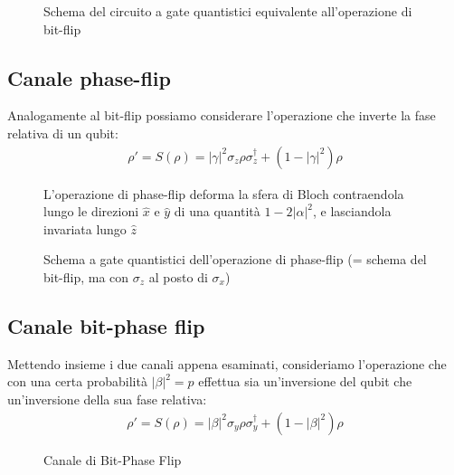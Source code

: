 \documentclass[../../InformazioneQuantistica.tex]{subfiles}
\begin{document}
\begin{figure}[H]
\centering

\caption{Schema del circuito a gate quantistici equivalente all'operazione di bit-flip\label{fig:bit-flip-gate}}
\end{figure}

\subsection{Canale phase-flip}
Analogamente al bit-flip possiamo considerare l'operazione che inverte la fase relativa di un qubit:
\begin{align*}
\rho' = S(\rho) = |\gamma|^2 \sigma_z \rho \sigma_z^\dag + (1-|\gamma|^2)\rho
\end{align*}

\begin{figure}[H]
\centering

\caption{L'operazione di phase-flip deforma la sfera di Bloch contraendola lungo le direzioni $\hat{x}$ e $\hat{y}$ di una quantità $1-2|\alpha|^2$, e lasciandola invariata lungo $\hat{z}$\label{fig:bit-phaseflip-geometrica}}
\end{figure}


\begin{figure}[H]
\centering

\caption{Schema a gate quantistici dell'operazione di phase-flip (= schema del bit-flip, ma con $\sigma_z$ al posto di $\sigma_x$)\label{fig:phase-flip}}
\end{figure}

\subsection{Canale bit-phase flip}
Mettendo insieme i due canali appena esaminati, consideriamo l'operazione che con una certa probabilità $|\beta|^2 = p$ effettua sia un'inversione del qubit che un'inversione  della sua fase relativa:
 \begin{align*}
\rho'=S(\rho) = |\beta|^2 \sigma_y \rho \sigma_y^\dag + (1-|\beta|^2 )\rho
\end{align*}


\begin{figure}[H]
    \centering
    
    \caption{Canale di Bit-Phase Flip}
    \label{fig:bit-phase-flip}
\end{figure}
\end{document}
